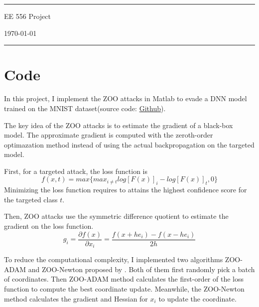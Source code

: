 \documentclass[a4paper]{article}
\begin{document}

\fancyhead[C]{}
\hrule \medskip %
\begin{minipage}{0.295\textwidth} 
\raggedright
\footnotesize

\end{minipage}
\begin{minipage}{0.4\textwidth} 
\centering 
\large 
EE 556 Project\\ 
\normalsize 
\end{minipage}
\begin{minipage}{0.295\textwidth} 
\raggedleft
\today\hfill\\
\end{minipage}
\medskip\hrule 
\bigskip


\section{Code}
In this project, I implement the ZOO attacks in Matlab to evade a DNN model trained on the MNIST dataset(source code: \href{https://github.com/Moirai7/ee556/}{Github}).

The key idea of the ZOO attacks is to estimate the gradient of a black-box model. The approximate gradient is computed with the zeroth-order optimazation method instead of using the actual backpropagation on the targeted model. 

First, for a targeted attack, the loss function is 
\begin{equation}
f(x,t) = max\{max_{i\neq t}log[F(x)]_i - log[F(x)]_t, 0\}
\end{equation} 
Minimizing the loss function requires to attains the highest confidence score for the targeted class $t$.

Then, ZOO attacks use the symmetric difference quotient to estimate the gradient on the loss function.
\begin{equation}
g_i = \frac{\partial f(x)}{\partial x_i} = \frac{f(x+he_i)-f(x-he_i)}{2h}
\end{equation}

To reduce the computational complexity, I implemented two algorithms ZOO-ADAM and ZOO-Newton proposed by \cite{1}. Both of them first randomly pick a batch of coordinates. Then ZOO-ADAM method calculates the first-order of the loss function to compute the best coordinate update. Meanwhile, the ZOO-Newton method calculates the gradient and Hessian for $x_i$ to update the coordinate.
\end{document}
